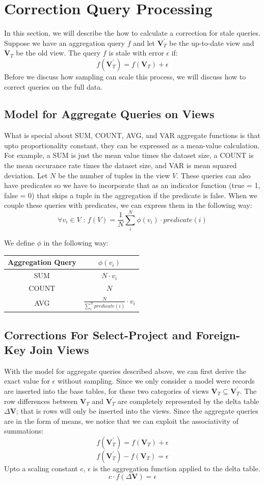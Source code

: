 \iffalse

\section{Correction Query Processing}
In this section, we will describe the how to calculate a 
correction for stale queries.
Suppose we have an aggregation query $f$ and let $\textbf{V}_{T}^{'}$ be the up-to-date view
and $\textbf{V}_{T}$ be the old view. 
The query $f$ is stale with error $\epsilon$ if:
\[
f(\textbf{V}_{T}^{'})=f(\textbf{V}_{T})+\epsilon
\]
Before we discuss how sampling can scale this process, we will discuss how to correct
queries on the full data.

\subsection{Model for Aggregate Queries on Views}
What is special about SUM, COUNT, AVG, and VAR aggregate functions
is that upto proportionality constant, they can be expressed as a mean-value calculation.
For example, a SUM is just the mean value times the dataset size, a COUNT 
is the mean occurance rate times the dataset size, and VAR is mean squared 
deviation.
Let $N$ be the number of tuples in the view $V$. 
These queries can also have predicates so we have to incorporate that
as an indicator function (true = 1, false = 0) that skips a tuple in the aggregation if the predicate is false. 
When we couple these queries with predicates, we can express them in the 
following way:
\[
\forall v_i \in V \text{ : } f(V)= \frac{1}{N} \sum_i^N \phi(v_i) \cdot predicate(i)
\]

We define $\phi$ in the following way:
\begin{center}
\begin{tabular}{|c|c|}
\hline 
Aggregation Query & $\phi(v_i)$\tabularnewline
\hline 
\hline 
SUM & $N \cdot v_i$\tabularnewline
\hline 
COUNT & $N$\tabularnewline
\hline 
AVG & $\frac{N}{\sum_i^N predicate(i)} \cdot v_i$\tabularnewline
\hline 
\end{tabular}
\par\end{center}

\subsection{Corrections For Select-Project and Foreign-Key Join Views}
With the model for aggregate queries described above, we can
first derive the exact value for $\epsilon$ without sampling.
Since we only consider a model were records are inserted into the
base tables, for these two categories of views $\textbf{V}_{T}\subseteq\textbf{V}_{T}^{'}$.
The row differences between $\textbf{V}_{T}$ and $\textbf{V}_{T}^{'}$
are completely represented by the delta table $\Delta\textbf{V}$;
that is rows will only be inserted into the views. 
Since the aggregate queries are in the form of means, we notice that we 
can exploit the associativity of summations:
\[
f(\textbf{V}_{T}^{'})=f(\textbf{V}_{T})+\epsilon
\]
\[
f(\textbf{V}_{T}^{'})-f(\textbf{V}_{T})=\epsilon
\]
Upto a scaling constant c, $\epsilon$ is the aggregation function
applied to the delta table. 
\[
c\cdot f(\Delta\textbf{V})=\epsilon
\]

